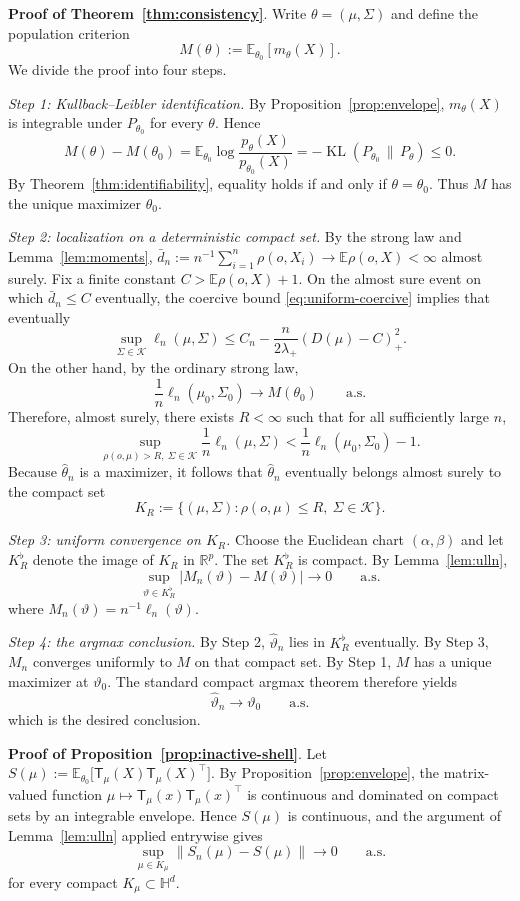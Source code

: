 \documentclass[11pt]{article}
\DeclareMathOperator{\KL}{KL}
\newcommand{\R}{\mathbb{R}}
\newcommand{\E}{\mathbb{E}}
\newcommand{\Hh}{\mathbb{H}}
\newcommand{\norm}[1]{\left\lVert #1\right\rVert}
\newcommand{\shell}{\mathcal{K}}
\newcommand{\T}{\mathsf{T}}
\begin{document}
\medskip
\noindent \textbf{Proof of Theorem~\ref{thm:consistency}}.  Write $\theta=(\mu,\Sigma)$ and define the population criterion
\[
M(\theta):=\E_{\theta_0}[m_\theta(X)].
\]
We divide the proof into four steps.

\smallskip
\noindent\emph{Step 1: Kullback--Leibler identification.}
By Proposition~\ref{prop:envelope}, $m_\theta(X)$ is integrable under $P_{\theta_0}$ for every $\theta$. Hence
\[
M(\theta)-M(\theta_0)
=
\E_{\theta_0}\log\frac{p_\theta(X)}{p_{\theta_0}(X)}
=
-\KL(P_{\theta_0}\,\|\,P_\theta)\le 0.
\]
By Theorem~\ref{thm:identifiability}, equality holds if and only if $\theta=\theta_0$. Thus $M$ has the unique maximizer $\theta_0$.

\smallskip
\noindent\emph{Step 2: localization on a deterministic compact set.}
By the strong law and Lemma~\ref{lem:moments}, $\bar d_n:=n^{-1}\sum_{i=1}^n \rho(o,X_i)\to \E\rho(o,X)<\infty$ almost surely. Fix a finite constant $C>\E\rho(o,X)+1$. On the almost sure event on which $\bar d_n\le C$ eventually, the coercive bound \eqref{eq:uniform-coercive} implies that eventually
\[
\sup_{\Sigma\in\shell}\ell_n(\mu,\Sigma)
\le
C_n-\frac{n}{2\lambda_+}(D(\mu)-C)_+^2.
\]
On the other hand, by the ordinary strong law,
\[
\frac1n\ell_n(\mu_0,\Sigma_0)\to M(\theta_0)
\qquad\text{a.s.}
\]
Therefore, almost surely, there exists $R<\infty$ such that for all sufficiently large $n$,
\[
\sup_{\rho(o,\mu)>R,\ \Sigma\in\shell}\frac1n\ell_n(\mu,\Sigma)
<
\frac1n\ell_n(\mu_0,\Sigma_0)-1.
\]
Because $\hat\theta_n$ is a maximizer, it follows that $\hat\theta_n$ eventually belongs almost surely to the compact set
\[
K_R:=\{(\mu,\Sigma):\rho(o,\mu)\le R,\ \Sigma\in\shell\}.
\]

\smallskip
\noindent\emph{Step 3: uniform convergence on $K_R$.}
Choose the Euclidean chart $(\alpha,\beta)$ and let $K_R^\flat$ denote the image of $K_R$ in $\R^p$. The set $K_R^\flat$ is compact. By Lemma~\ref{lem:ulln}, 
\[
\sup_{\vartheta\in K_R^\flat}|M_n(\vartheta)-M(\vartheta)|\to 0
\qquad\text{a.s.}
\]
where $M_n(\vartheta)=n^{-1}\ell_n(\vartheta)$.

\smallskip
\noindent\emph{Step 4: the argmax conclusion.}
By Step 2, $\hat\vartheta_n$ lies in $K_R^\flat$ eventually. By Step 3, $M_n$ converges uniformly to $M$ on that compact set. By Step 1, $M$ has a unique maximizer at $\vartheta_0$. The standard compact argmax theorem therefore yields
\[
\hat\vartheta_n\to \vartheta_0
\qquad\text{a.s.}
\]
which is the desired conclusion.

\medskip
\noindent \textbf{Proof of Proposition~\ref{prop:inactive-shell}}. Let $S(\mu):=\E_{\theta_0}\bigl[\T_\mu(X)\T_\mu(X)^\top\bigr]$. By Proposition~\ref{prop:envelope}, the matrix-valued function $\mu\mapsto \T_\mu(x)\T_\mu(x)^\top$ is continuous and dominated on compact sets by an integrable envelope. Hence $S(\mu)$ is continuous, and the argument of Lemma~\ref{lem:ulln} applied entrywise gives
\[
\sup_{\mu\in K_\mu}\norm{S_n(\mu)-S(\mu)}\to 0
\qquad\text{a.s.}
\]
for every compact $K_\mu\subset\Hh^d$.
\end{document}

